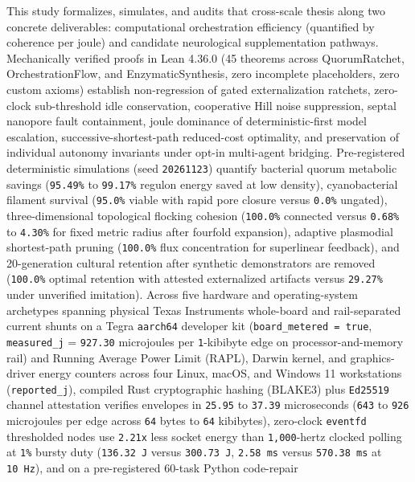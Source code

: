 \documentclass[10pt,letterpaper]{article}
\begin{document}
This study formalizes, simulates, and audits that cross-scale thesis
along two concrete deliverables: computational orchestration efficiency
(quantified by coherence per joule) and candidate neurological
supplementation pathways. Mechanically verified proofs in Lean 4.36.0
(45 theorems across QuorumRatchet, OrchestrationFlow, and
EnzymaticSynthesis, zero incomplete placeholders, zero custom axioms)
establish non-regression of gated externalization ratchets, zero-clock
sub-threshold idle conservation, cooperative Hill noise suppression,
septal nanopore fault containment, joule dominance of
deterministic-first model escalation, successive-shortest-path
reduced-cost optimality, and preservation of individual autonomy
invariants under opt-in multi-agent bridging. Pre-registered
deterministic simulations (seed \texttt{20261123}) quantify bacterial
quorum metabolic savings (\texttt{95.49\%} to \texttt{99.17\%} regulon
energy saved at low density), cyanobacterial filament survival
(\texttt{95.0\%} viable with rapid pore closure versus \texttt{0.0\%}
ungated), three-dimensional topological flocking cohesion
(\texttt{100.0\%} connected versus \texttt{0.68\%} to \texttt{4.30\%}
for fixed metric radius after fourfold expansion), adaptive plasmodial
shortest-path pruning (\texttt{100.0\%} flux concentration for
superlinear feedback), and 20-generation cultural retention after
synthetic demonstrators are removed (\texttt{100.0\%} optimal retention
with attested externalized artifacts versus \texttt{29.27\%} under
unverified imitation). Across five hardware and operating-system
archetypes spanning physical Texas Instruments whole-board and
rail-separated current shunts on a Tegra \texttt{aarch64} developer kit
(\texttt{board\_\allowbreak{}metered\ =\ true}, \texttt{measured\_\allowbreak{}j} =
\texttt{927.30} microjoules per \texttt{1}-kibibyte edge on
processor-and-memory rail) and Running Average Power Limit (RAPL),
Darwin kernel, and graphics-driver energy counters across four Linux,
macOS, and Windows 11 workstations (\texttt{reported\_\allowbreak{}j}), compiled Rust
cryptographic hashing (BLAKE3) plus \texttt{Ed25519} channel attestation
verifies envelopes in \texttt{25.95} to \texttt{37.39} microseconds
(\texttt{643} to \texttt{926} microjoules per edge across \texttt{64}
bytes to \texttt{64} kibibytes), zero-clock \texttt{eventfd} thresholded
nodes use \texttt{2.21x} less socket energy than \texttt{1,000}-hertz
clocked polling at \texttt{1\%} bursty duty (\texttt{136.32\ J} versus
\texttt{300.73\ J}, \texttt{2.58\ ms} versus \texttt{570.\allowbreak{}38\ ms} at
\texttt{10\ Hz}), and on a pre-registered 60-task Python code-repair
\end{document}
